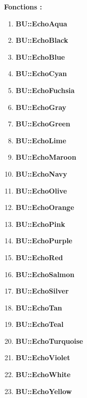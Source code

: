 \documentclass[a4paper,10pt]{article}
\begin{document}
\begin{justify}
    \textbf{Fonctions :}
    \begin{enumerate}
        \item \textbf{\color{Aqua}BU::EchoAqua}\setlength{\parskip}{0em}
        \item \textbf{\color{text}BU::EchoBlack}
        \item \textbf{\color{Blue}BU::EchoBlue}

        \setlength{\parskip}{1em}

        \item \textbf{\color{Cyan}BU::EchoCyan}\setlength{\parskip}{0em}
        \item \textbf{\color{Fuchsia}BU::EchoFuchsia}
        \item \textbf{\color{Gray}BU::EchoGray}

        \setlength{\parskip}{1em}

        \item \textbf{\color{Green}BU::EchoGreen}\setlength{\parskip}{0em}
        \item \textbf{\color{Lime}BU::EchoLime}
        \item \textbf{\color{Maroon}BU::EchoMaroon}

        \setlength{\parskip}{1em}

        \item \textbf{\color{Navy}BU::EchoNavy}\setlength{\parskip}{0em}
        \item \textbf{\color{Olive}BU::EchoOlive}
        \item \textbf{\color{Orange}BU::EchoOrange}

        \setlength{\parskip}{1em}

        \item \textbf{\color{Pink}BU::EchoPink}\setlength{\parskip}{0em}
        \item \textbf{\color{Purple}BU::EchoPurple}
        \item \textbf{\color{Red}BU::EchoRed}

        \setlength{\parskip}{1em}

        \item \textbf{\color{Salmon}BU::EchoSalmon}\setlength{\parskip}{0em}
        \item \textbf{\color{Silver}BU::EchoSilver}
        \item \textbf{\color{Tan}BU::EchoTan}

        \setlength{\parskip}{1em}

        \item \textbf{\color{Teal}BU::EchoTeal}\setlength{\parskip}{0em}
        \item \textbf{\color{Turquoise}BU::EchoTurquoise}
        \item \textbf{\color{Violet}BU::EchoViolet}

        \setlength{\parskip}{1em}

        \item \textbf{\color{text}BU::EchoWhite}\setlength{\parskip}{0em}
        \item \textbf{\color{Yellow}BU::EchoYellow}
    \end{enumerate}
\end{justify}
\end{document}
